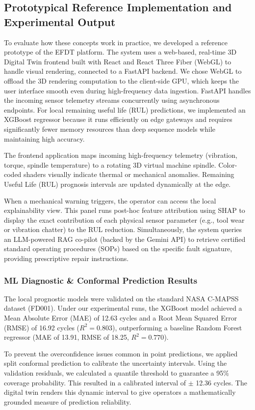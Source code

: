 \documentclass[journal,10pt,compsoc]{IEEEtran}
\begin{document}
\subsection{Prototypical Reference Implementation and Experimental Output}
To evaluate how these concepts work in practice, we developed a reference prototype of the EFDT platform. The system uses a web-based, real-time 3D Digital Twin frontend built with React and React Three Fiber (WebGL) to handle visual rendering, connected to a FastAPI backend. We chose WebGL to offload the 3D rendering computation to the client-side GPU, which keeps the user interface smooth even during high-frequency data ingestion. FastAPI handles the incoming sensor telemetry streams concurrently using asynchronous endpoints. For local remaining useful life (RUL) predictions, we implemented an XGBoost regressor because it runs efficiently on edge gateways and requires significantly fewer memory resources than deep sequence models while maintaining high accuracy.

The frontend application maps incoming high-frequency telemetry (vibration, torque, spindle temperature) to a rotating 3D virtual machine spindle. Color-coded shaders visually indicate thermal or mechanical anomalies. Remaining Useful Life (RUL) prognosis intervals are updated dynamically at the edge.

When a mechanical warning triggers, the operator can access the local explainability view. This panel runs post-hoc feature attribution using SHAP to display the exact contribution of each physical sensor parameter (e.g., tool wear or vibration chatter) to the RUL reduction. Simultaneously, the system queries an LLM-powered RAG co-pilot (backed by the Gemini API) to retrieve certified standard operating procedures (SOPs) based on the specific fault signature, providing prescriptive repair instructions.

\subsubsection{ML Diagnostic \& Conformal Prediction Results}
The local prognostic models were validated on the standard NASA C-MAPSS dataset (FD001). Under our experimental runs, the XGBoost model achieved a Mean Absolute Error (MAE) of 12.63 cycles and a Root Mean Squared Error (RMSE) of 16.92 cycles ($R^2 = 0.803$), outperforming a baseline Random Forest regressor (MAE of 13.91, RMSE of 18.25, $R^2 = 0.770$).

To prevent the overconfidence issues common in point predictions, we applied split conformal prediction to calibrate the uncertainty intervals. Using the validation residuals, we calculated a quantile threshold to guarantee a 95\% coverage probability. This resulted in a calibrated interval of $\pm$ 12.36 cycles. The digital twin renders this dynamic interval to give operators a mathematically grounded measure of prediction reliability.
\end{document}
